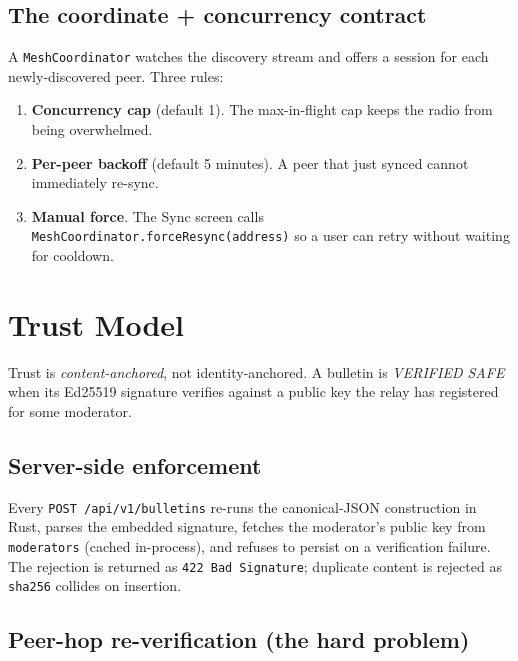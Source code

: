 \documentclass[11pt,a4paper]{article}
\begin{document}
\subsection{The coordinate + concurrency contract}
\label{sec:coordinator}

A \texttt{MeshCoordinator} watches the discovery stream and offers a
session for each newly-discovered peer. Three rules:
\begin{enumerate}[leftmargin=*,label=\textbf{\arabic*.}]
  \item \textbf{Concurrency cap} (default 1). The max-in-flight cap
        keeps the radio from being overwhelmed.
  \item \textbf{Per-peer backoff} (default 5 minutes). A peer that
        just synced cannot immediately re-sync.
  \item \textbf{Manual force}. The Sync screen calls
        \texttt{MeshCoordinator.forceResync(address)} so a user can
        retry without waiting for cooldown.
\end{enumerate}

\section{Trust Model}
\label{sec:trust}

Trust is \emph{content-anchored}, not identity-anchored. A bulletin is
\emph{VERIFIED SAFE} when its Ed25519 signature verifies against a
public key the relay has registered for some moderator.

\subsection{Server-side enforcement}
\label{sec:server-trust}

Every \texttt{POST /api/v1/bulletins} re-runs the canonical-JSON
construction in Rust, parses the embedded signature, fetches the
moderator's public key from \texttt{moderators} (cached in-process),
and refuses to persist on a verification failure. The rejection is
returned as \texttt{422 Bad Signature}; duplicate content is rejected
as \texttt{sha256} collides on insertion.

\subsection{Peer-hop re-verification (the hard problem)}
\label{sec:peer-trust}
\end{document}

